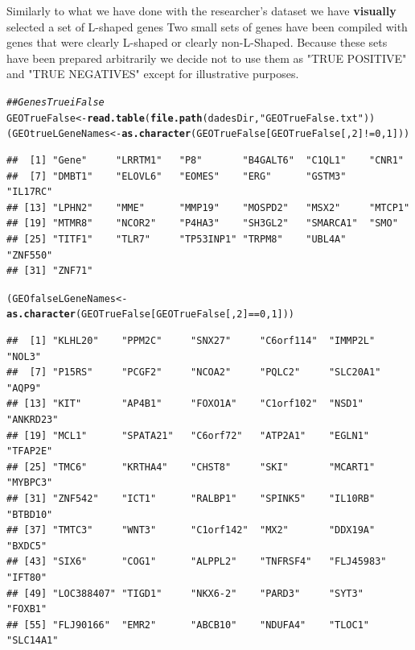 \documentclass[a4paper,10pt]{article}\usepackage[]{graphicx}\usepackage[]{xcolor}
\makeatletter
\newcommand{\hlnum}[1]{\textcolor[rgb]{0.686,0.059,0.569}{#1}}%
\newcommand{\hlstr}[1]{\textcolor[rgb]{0.192,0.494,0.8}{#1}}%
\newcommand{\hlcom}[1]{\textcolor[rgb]{0.678,0.584,0.686}{\textit{#1}}}%
\newcommand{\hlopt}[1]{\textcolor[rgb]{0,0,0}{#1}}%
\newcommand{\hlstd}[1]{\textcolor[rgb]{0.345,0.345,0.345}{#1}}%
\newcommand{\hlkwb}[1]{\textcolor[rgb]{0.69,0.353,0.396}{#1}}%
\newcommand{\hlkwd}[1]{\textcolor[rgb]{0.737,0.353,0.396}{\textbf{#1}}}%
\newenvironment{kframe}{%
 \def\at@end@of@kframe{}%
 \ifinner\ifhmode%
  \def\at@end@of@kframe{\end{minipage}}%
  \begin{minipage}{\columnwidth}%
 \fi\fi%
 \def\FrameCommand##1{\hskip\@totalleftmargin \hskip-\fboxsep
 \colorbox{shadecolor}{##1}\hskip-\fboxsep
     \hskip-\linewidth \hskip-\@totalleftmargin \hskip\columnwidth}%
 \MakeFramed {\advance\hsize-\width
   \@totalleftmargin\z@ \linewidth\hsize
   \@setminipage}}%
 {\par\unskip\endMakeFramed%
 \at@end@of@kframe}
\newenvironment{knitrout}{}{} %
\makeatother
\begin{document}
Similarly to what we have done with the researcher's dataset we have \textbf{visually} selected a set of L-shaped genes Two small sets of genes have been compiled with genes that were clearly L-shaped or clearly non-L-Shaped. Because these sets have been prepared arbitrarily we decide not to use them as "TRUE POSITIVE" and "TRUE NEGATIVES" except for illustrative purposes.

\begin{knitrout}
\color{fgcolor}\begin{kframe}
\begin{alltt}
\hlcom{## Genes True i False}
\hlstd{GEOTrueFalse} \hlkwb{<-} \hlkwd{read.table}\hlstd{(}\hlkwd{file.path}\hlstd{(dadesDir,} \hlstr{"GEOTrueFalse.txt"}\hlstd{))}
\hlstd{(GEOtrueLGeneNames} \hlkwb{<-} \hlkwd{as.character}\hlstd{(GEOTrueFalse[GEOTrueFalse[,}\hlnum{2}\hlstd{]}\hlopt{!=}\hlnum{0}\hlstd{,}\hlnum{1}\hlstd{]))}
\end{alltt}
\begin{verbatim}
##  [1] "Gene"     "LRRTM1"   "P8"       "B4GALT6"  "C1QL1"    "CNR1"    
##  [7] "DMBT1"    "ELOVL6"   "EOMES"    "ERG"      "GSTM3"    "IL17RC"  
## [13] "LPHN2"    "MME"      "MMP19"    "MOSPD2"   "MSX2"     "MTCP1"   
## [19] "MTMR8"    "NCOR2"    "P4HA3"    "SH3GL2"   "SMARCA1"  "SMO"     
## [25] "TITF1"    "TLR7"     "TP53INP1" "TRPM8"    "UBL4A"    "ZNF550"  
## [31] "ZNF71"
\end{verbatim}
\begin{alltt}
\hlstd{(GEOfalseLGeneNames} \hlkwb{<-} \hlkwd{as.character}\hlstd{(GEOTrueFalse[GEOTrueFalse[,}\hlnum{2}\hlstd{]}\hlopt{==}\hlnum{0}\hlstd{,}\hlnum{1}\hlstd{]))}
\end{alltt}
\begin{verbatim}
##  [1] "KLHL20"    "PPM2C"     "SNX27"     "C6orf114"  "IMMP2L"    "NOL3"     
##  [7] "P15RS"     "PCGF2"     "NCOA2"     "PQLC2"     "SLC20A1"   "AQP9"     
## [13] "KIT"       "AP4B1"     "FOXO1A"    "C1orf102"  "NSD1"      "ANKRD23"  
## [19] "MCL1"      "SPATA21"   "C6orf72"   "ATP2A1"    "EGLN1"     "TFAP2E"   
## [25] "TMC6"      "KRTHA4"    "CHST8"     "SKI"       "MCART1"    "MYBPC3"   
## [31] "ZNF542"    "ICT1"      "RALBP1"    "SPINK5"    "IL10RB"    "BTBD10"   
## [37] "TMTC3"     "WNT3"      "C1orf142"  "MX2"       "DDX19A"    "BXDC5"    
## [43] "SIX6"      "COG1"      "ALPPL2"    "TNFRSF4"   "FLJ45983"  "IFT80"    
## [49] "LOC388407" "TIGD1"     "NKX6-2"    "PARD3"     "SYT3"      "FOXB1"    
## [55] "FLJ90166"  "EMR2"      "ABCB10"    "NDUFA4"    "TLOC1"     "SLC14A1"  

\end{verbatim}
\end{kframe}
\end{knitrout}
\end{document}
